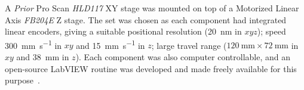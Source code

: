A \emph{Prior} Pro Scan \textit{HLD117} XY stage was mounted on top of a Motorized Linear Axis \textit{FB204E} Z stage.
The set was chosen as each component had integrated linear encoders, giving a suitable positional resolution (\SI{20}{\nano\meter} in \(xyz\));
speed \SI{300}{\milli\meter\per\second} in \(xy\) and \SI{15}{\milli\meter\per\second} in \(z\);
large travel range (\(\SI{120}{\milli\meter} \times \SI{72}{\milli\meter} \) in \(xy\) and \SI{38}{\milli\meter} in \(z\)). %
Each component was also computer controllable, and an open-source \gls{LabVIEW} routine was developed and made freely available for this purpose~\cite{russellSpimcontroller2017}.
%
%
